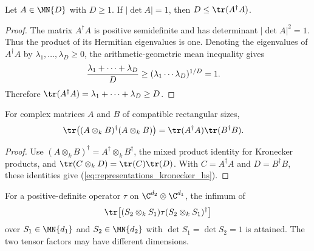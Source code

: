\begin{lemma}
\label{lem:det_amgm_hilbert_schmidt_bound}
    \leanok
    Let $A\in\MN{D}$ with $D\geq1$. If $|\det A|=1$, then
    $D\leq\tr(A^{\dagger}A)$.
\end{lemma}

\begin{proof}
    \leanok
    The matrix $A^{\dagger}A$ is positive semidefinite and has determinant
    $|\det A|^{2}=1$. Thus the product of its Hermitian eigenvalues is one.
    Denoting the eigenvalues of $A^{\dagger}A$ by
    $\lambda_{1},\ldots,\lambda_{D}\geq0$, the arithmetic-geometric mean
    inequality gives
    \begin{align}
        \frac{\lambda_{1}+\cdots+\lambda_{D}}{D}
        &\geq(\lambda_{1}\cdots\lambda_{D})^{1/D}
         =1.
        \notag
    \end{align}
    Therefore
    $\tr(A^{\dagger}A)=\lambda_{1}+\cdots+\lambda_{D}\geq D$.
\end{proof}

\begin{lemma}
\label{lem:kronecker_hilbert_schmidt_trace}
    \leanok
    For complex matrices $A$ and $B$ of compatible rectangular sizes,
    \begin{align}
        \tr\!\left((A\otimes_{k}B)^{\dagger}
            (A\otimes_{k}B)\right)
        &=\tr(A^{\dagger}A)\tr(B^{\dagger}B).
        \label{eq:representations_kronecker_hs}
    \end{align}
\end{lemma}

\begin{proof}
    \leanok
    Use
    $(A\otimes_{k}B)^{\dagger}=A^{\dagger}\otimes_{k}B^{\dagger}$, the mixed
    product identity for Kronecker products, and
    $\tr(C\otimes_{k}D)=\tr(C)\tr(D)$. With
    $C=A^{\dagger}A$ and $D=B^{\dagger}B$, these identities give
    (\ref{eq:representations_kronecker_hs}).
\end{proof}

\begin{lemma}\label{lem:infimum_is_attained}
    \leanok
    For a positive-definite operator $\tau$ on $\C^{d_2}\otimes\C^{d_1}$,
    the infimum of
    \begin{align}
        \tr\!\left[(S_{2}\otimes_{k}S_{1})\tau
            (S_{2}\otimes_{k}S_{1})^{\dagger}\right]
        \notag
    \end{align}
    over $S_{1}\in\MN{d_1}$ and $S_{2}\in\MN{d_2}$ with
    $\det S_{1}=\det S_{2}=1$ is attained.  The two tensor factors may have
    different dimensions.
\end{lemma}

